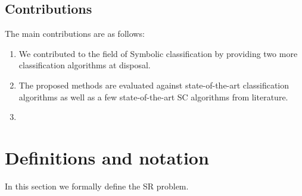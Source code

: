 \documentclass{bmcart}
\begin{document}
 
 

\subsection{Contributions}\label{sec:contibutions}

The main contributions are as follows: 

\begin{enumerate}
	\item We contributed to the field of Symbolic classification by providing two more classification algorithms at disposal. 
	
	\item The proposed methods are evaluated against state-of-the-art classification algorithms as well as a few state-of-the-art SC algorithms from literature. 
	\item {}
\end{enumerate}
 
\section{Definitions and notation} \label{sec:search-space}

In this section we formally define the SR problem.
\end{document}
